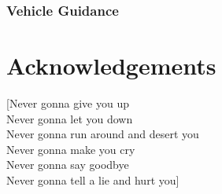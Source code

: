 \documentclass[a4paper, 12pt]{report}
\begin{document}
		\subsection{Vehicle Guidance}

\chapter{Acknowledgements}

[Never gonna give you up\\
Never gonna let you down\\
Never gonna run around and desert you\\
Never gonna make you cry\\
Never gonna say goodbye\\
Never gonna tell a lie and hurt you]

\newpage

\end{document}

